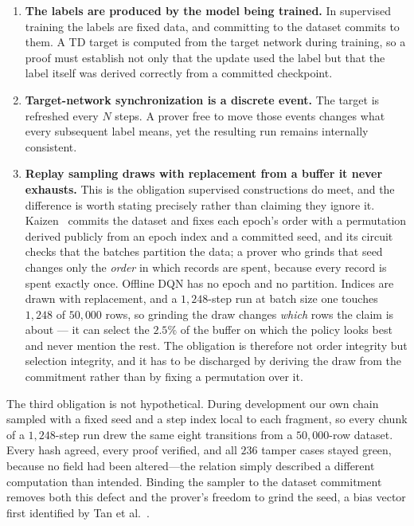 \begin{enumerate}[leftmargin=1.8em]
  \item \textbf{The labels are produced by the model being trained.} In
  supervised training the labels are fixed data, and committing to the dataset
  commits to them. A TD target is computed from the target network during
  training, so a proof must establish not only that the update used the label
  but that the label itself was derived correctly from a committed checkpoint.
  \item \textbf{Target-network synchronization is a discrete event.} The
  target is refreshed every $N$ steps. A prover free to move those events
  changes what every subsequent label means, yet the resulting run remains
  internally consistent.
  \item \textbf{Replay sampling draws with replacement from a buffer it never
  exhausts.} This is the obligation supervised constructions do meet, and the
  difference is worth stating precisely rather than claiming they ignore it.
  Kaizen~\cite{kaizen2024} commits the dataset and fixes each epoch's order
  with a permutation derived publicly from an epoch index and a committed seed,
  and its circuit checks that the batches partition the data; a prover who
  grinds that seed changes only the \emph{order} in which records are spent,
  because every record is spent exactly once. Offline DQN has no epoch and no
  partition. Indices are drawn with replacement, and a $1{,}248$-step run at
  batch size one touches $1{,}248$ of $50{,}000$ rows, so grinding the draw
  changes \emph{which} rows the claim is about --- it can select the $2.5\%$ of
  the buffer on which the policy looks best and never mention the rest. The
  obligation is therefore not order integrity but selection integrity, and it
  has to be discharged by deriving the draw from the commitment rather than by
  fixing a permutation over it.
\end{enumerate}

\noindent The third obligation is not hypothetical. During development our own
chain sampled with a fixed seed and a step index local to each fragment, so
every chunk of a $1{,}248$-step run drew the same eight transitions from a
$50{,}000$-row dataset. Every hash agreed, every proof verified, and all $236$
tamper cases stayed green, because no field had been altered---the relation
simply described a different computation than intended. Binding the sampler to
the dataset commitment removes both this defect and the prover's freedom to
grind the seed, a bias vector first identified by Tan et
al.~\cite{zkpotvicinity2025}.

